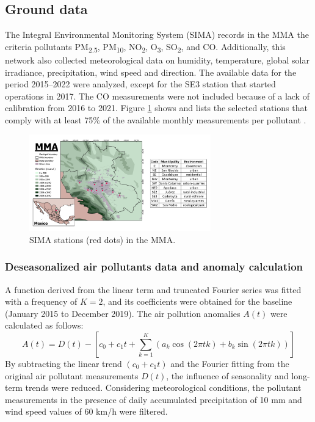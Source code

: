 \documentclass[preprint,12pt]{elsarticle}
\begin{document}
\subsection{Ground data}
The Integral Environmental Monitoring System (SIMA) records in the MMA the criteria pollutants PM\textsubscript{2.5}, PM\textsubscript{10}, NO\textsubscript{2}, O\textsubscript{3}, SO\textsubscript{2}, and CO. Additionally, this network also collected meteorological data on humidity, temperature, global solar irradiance, precipitation, wind speed and direction. The available data for the period 2015--2022 were analyzed, except for the SE3 station that started operations in 2017. The CO measurements were not included because of a lack of calibration from 2016 to 2021. Figure \ref{596247} shows and lists the selected stations that comply with at least 75\% of the available monthly measurements per pollutant \citep{mtodos}.
\begin{figure}[H]
	\begin{center}
		\includegraphics[width=0.70\textwidth]{figures/amm_tabla.png}
		\caption{SIMA stations (red dots) in the MMA.
				{\label{596247}}}
	\end{center}
\end{figure}
\subsubsection{Deseasonalized air pollutants data and anomaly calculation}
A function derived from the linear term and truncated Fourier series was fitted with a frequency of \(K=2\), and its coefficients were obtained \citep{Hernandez-Paniagua2021} for the baseline (January 2015 to December 2019). The air pollution anomalies \(A\left(t\right)\) were calculated as follows:
\begin{equation}
	A\left(t\right)=D\left(t\right)-\left[c_0+c_1t+ \sum_{k=1}^{K}\left(a_{k}\cos(2\pi tk)+b_{k}\sin(2\pi tk)\right)\right]
	\label{eq:anomalies}
\end{equation}
By subtracting the linear trend \((c_{0}+c_{1}t)\) and the Fourier fitting from the original air pollutant measurements \(D(t)\), the influence of seasonality and long-term trends were reduced. Considering meteorological conditions, the pollutant measurements in the presence of daily accumulated precipitation of 10 mm and wind speed values of 60 km/h were filtered.
\end{document}
